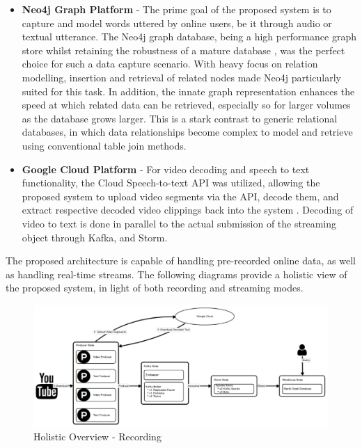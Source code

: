 \documentclass[10pt,conference]{IEEEtran}
\begin{document}
\begin{itemize}
    \item \textbf{Neo4j Graph Platform} - The prime goal of the proposed system is to capture and model words uttered by online users, be it through audio or textual utterance. The Neo4j graph database, being a high performance graph store whilst retaining the robustness of a mature database \cite{Neo4j}, was the perfect choice for such a data capture scenario. With heavy focus on relation modelling, insertion and retrieval of related nodes made Neo4j particularly suited for this task. In addition, the innate graph representation enhances the speed at which related data can be retrieved, especially so for larger volumes as the database grows larger. This is a stark contrast to generic relational databases, in which data relationships become complex to model and retrieve using conventional table join methods.

    \item \textbf{Google Cloud Platform} - For video decoding and speech to text functionality, the Cloud Speech-to-text API was utilized, allowing the proposed system to upload video segments via the API, decode them, and extract respective decoded video clippings back into the system \cite{GoogleSpeech}. Decoding of video to text is done in parallel to the actual submission of the streaming object through Kafka, and Storm.
\end{itemize}

The proposed architecture is capable of handling pre-recorded online data, as well as handling real-time streams. The following diagrams provide a holistic view of the proposed system, in light of both recording and streaming modes.

\begin{figure}
  \includegraphics[width=\linewidth]{HolisticOverviewRecording.png}
  \caption                          {Holistic Overview - Recording}
  \label                            {fig:HolisticOverviewRecording}
\end{figure}
\end{document}
